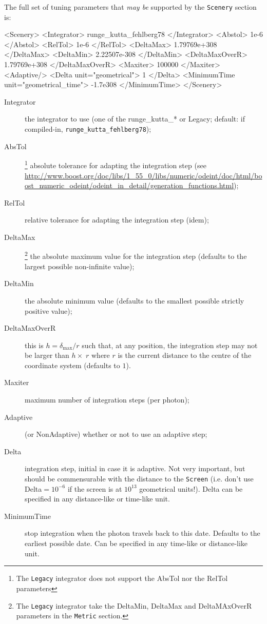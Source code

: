 \documentclass[a4paper,12pt]{article}
\begin{document}
The full set of tuning parameters that \emph{may be} supported by the
\texttt{Scenery} section is:
\begin{code}
<Scenery>
  <Integrator> runge_kutta_fehlberg78 </Integrator>
  <Abstol> 1e-6 </Abstol>
  <RelTol> 1e-6 </RelTol>
  <DeltaMax> 1.79769e+308 </DeltaMax>
  <DeltaMin> 2.22507e-308 </DeltaMin>
  <DeltaMaxOverR> 1.79769e+308 </DeltaMaxOverR>
  <Maxiter> 100000 </Maxiter>
  <Adaptive/>
  <Delta unit="geometrical"> 1 </Delta>
  <MinimumTime unit="geometrical_time"> -1.7e308 </MinimumTime>
</Scenery>
\end{code}

\begin{description}
\item[Integrator] the integrator to use (one of the runge\_kutta\_* or
  Legacy; default: if compiled-in, \texttt{runge\_kutta\_fehlberg78});
\item[AbsTol]\footnote{\label{note:abstol}The \texttt{Legacy}
    integrator does not support the AbsTol nor the RelTol parameters}
  absolute tolerance for adapting the integration step (see
  \url{http://www.boost.org/doc/libs/1_55_0/libs/numeric/odeint/doc/html/boost_numeric_odeint/odeint_in_detail/generation_functions.html});
\item[RelTol]\footnotemark[\value{footnote}] relative tolerance for
  adapting the integration step (idem);
\item[DeltaMax]\footnote{The \texttt{Legacy} integrator take the
    DeltaMin, DeltaMax and DeltaMAxOverR parameters in the
    \texttt{Metric} section.} the absolute maximum value for the
  integration step (defaults to the largest possible non-infinite
  value);
\item[DeltaMin]\footnotemark[\value{footnote}] the absolute minimum value (defaults to the smallest
  possible strictly positive value);
\item[DeltaMaxOverR]\footnotemark[\value{footnote}] this is $h=\delta_\text{max}/r$ such that, at any
  position, the integration step may not be larger than $h\times\;r$
  where $r$ is the current distance to the centre of the coordinate
  system (defaults to $1$).
\item[Maxiter] maximum number of integration steps (per photon);
\item[Adaptive] (or NonAdaptive) whether or not to use an adaptive step;
\item[Delta] integration step, initial in case it is adaptive. Not
  very important, but should be commensurable with the distance to the
  \texttt{Screen} (i.e. don't use Delta$=10^{-6}$ if the screen is at
  $10^{13}$ geometrical units!). Delta can be specified in any
  distance-like or time-like unit.
\item[MinimumTime] stop integration when the photon travels back to
  this date. Defaults to the earliest possible date. Can be specified
  in any time-like or distance-like unit.
\end{description}
\end{document}
